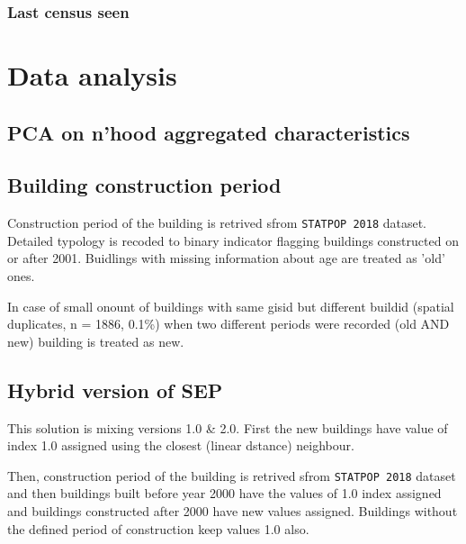 \documentclass[a4paper, notitlepage, fleqn]{article} %
\begin{document}
\subsubsection{Last census seen}
\begin{stlog}\end{stlog}
\newpage
\section{Data analysis}
\subsection{PCA on n'hood aggregated characteristics}
\begin{stlog}\end{stlog}
\newpage
\subsection{Building construction period}

Construction period of the building is retrived sfrom \texttt{STATPOP 2018} dataset. Detailed typology is recoded to binary indicator flagging buildings constructed on or after 2001. Buidlings with missing information about age are treated as 'old' ones. 

In case of small onount of buildings with same gisid but different buildid 
(spatial duplicates, n = 1886, 0.1\%) 
when two different periods were recorded (old AND new) building is treated as new. 
\begin{stlog}\end{stlog}
\newpage
\subsection{Hybrid version of SEP}

This solution is mixing versions 1.0 \& 2.0. First the new buildings have value of index 1.0 assigned using the closest (linear dstance) neighbour. 

Then, construction period of the building is retrived sfrom \texttt{STATPOP 2018} dataset and then buildings built before year 2000 have the values of 1.0 index assigned and buildings constructed after 2000 have new values assigned. Buildings without the defined period of construction keep values 1.0 also. 
\end{document}
